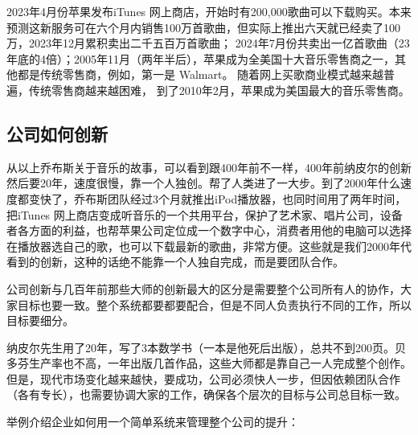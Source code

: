 2023年4月份苹果发布iTunes
网上商店，开始时有200,000歌曲可以下载购买。本来预测这新服务可在六个月内销售100万首歌曲，但实际上推出六天就已经卖了100万，2023年12月累积卖出二千五百万首歌曲；
2024年7月份共卖出一亿首歌曲（23年底的4倍）；2005年11月（两年半后），苹果成为全美国十大音乐零售商之一，其他都是传统零售商，例如，第一是
Walmart。 随着网上买歌商业模式越来越普遍，传统零售商越来越困难，
到了2010年2月，苹果成为美国最大的音乐零售商。

\hypertarget{ux516cux53f8ux5982ux4f55ux521bux65b0-1}{%
\subsection{公司如何创新}\label{ux516cux53f8ux5982ux4f55ux521bux65b0-1}}

从以上乔布斯关于音乐的故事，可以看到跟400年前不一样，400年前纳皮尔的创新然后要20年，速度很慢，靠一个人独创。帮了人类进了一大步。到了2000年什么速度都变快了，乔布斯团队经过3个月就推出iPod播放器，也同时间用了两年时间，把iTunes
网上商店变成听音乐的一个共用平台，保护了艺术家、唱片公司，设备者各方面的利益，也帮苹果公司定位成一个数字中心，消费者用他的电脑可以选择在播放器选自己的歌，也可以下载最新的歌曲，非常方便。这些就是我们2000年代看到的创新，这种的话绝不能靠一个人独自完成，而是要团队合作。

公司创新与几百年前那些大师的创新最大的区分是需要整个公司所有人的协作，大家目标也要一致。整个系统都要都要配合，但是不同人负责执行不同的工作，所以目标要细分。

纳皮尔先生用了20年，写了3本数学书（一本是他死后出版），总共不到200页。贝多芬生产率也不高，一年出版几首作品，这些大师都是靠自己一人完成整个创作。但是，现代市场变化越来越快，要成功，公司必须快人一步，但因依赖团队合作（各有专长），也需要协调大家的工作，确保各个层次的目标与公司总目标一致。

举例介绍企业如何用一个简单系统来管理整个公司的提升：

